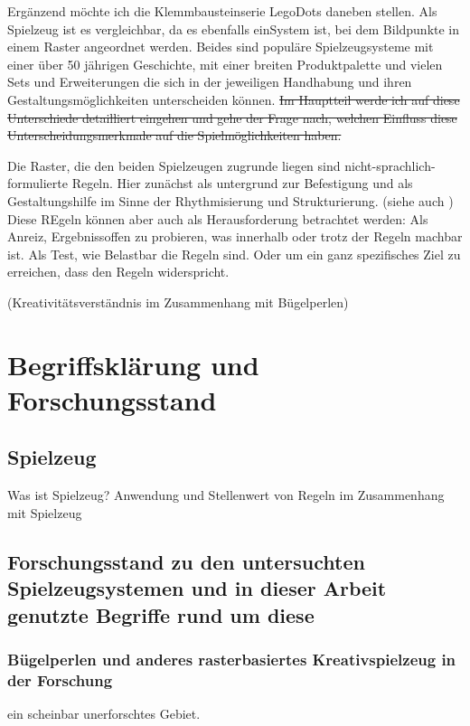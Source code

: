 \documentclass[11pt,a4paper,twoside]{scrreprt}
\begin{document}
Ergänzend möchte ich die Klemmbausteinserie Lego\texttrademark Dots daneben stellen. Als Spielzeug ist es vergleichbar, da es ebenfalls einSystem ist, bei dem Bildpunkte in einem Raster angeordnet werden. Beides sind populäre Spielzeugsysteme mit einer über 50 jährigen Geschichte, mit einer breiten Produktpalette und vielen Sets und Erweiterungen die sich in der jeweiligen Handhabung und ihren Gestaltungsmöglichkeiten unterscheiden können.
\sout{Im Hauptteil werde ich auf diese Unterschiede detailliert eingehen und gehe der Frage nach, welchen Einfluss diese Unterscheidungsmerkmale auf die Spielmöglichkeiten haben.}

Die Raster, die den beiden Spielzeugen zugrunde liegen sind nicht-sprachlich-formulierte Regeln. Hier zunächst als untergrund zur Befestigung und als Gestaltungshilfe im Sinne der Rhythmisierung und Strukturierung. (siehe auch \cite{formfindung})
Diese REgeln können aber auch als Herausforderung betrachtet werden: Als Anreiz, Ergebnissoffen zu probieren, was innerhalb oder trotz der Regeln machbar ist. Als Test, wie Belastbar die Regeln sind. Oder um ein ganz spezifisches Ziel zu erreichen, dass den Regeln widerspricht. 

(Kreativitätsverständnis im Zusammenhang mit Bügelperlen)


\iffalse

\chapter{Begriffsklärung und Forschungsstand}

	\section{Spielzeug}
	Was ist Spielzeug? Anwendung und Stellenwert von Regeln im Zusammenhang mit Spielzeug
	
	\section{Forschungsstand zu den untersuchten Spielzeugsystemen und in dieser Arbeit genutzte Begriffe rund um diese}
		\subsection{Bügelperlen und anderes rasterbasiertes Kreativspielzeug in der Forschung}
		ein scheinbar unerforschtes Gebiet.
\end{document}
